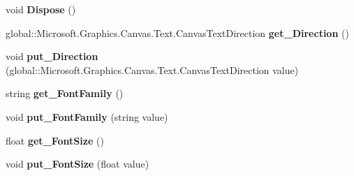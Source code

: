 \begin{DoxyCompactItemize}
\mbox{\label{class_microsoft_1_1_graphics_1_1_canvas_1_1_text_1_1_canvas_text_format_a174c6d766e1732425a63a7ee7ca6a9bb}} 
void {\bfseries Dispose} ()
\item 
\mbox{\label{class_microsoft_1_1_graphics_1_1_canvas_1_1_text_1_1_canvas_text_format_a47023dedd64cd980189d5fc8fe614629}} 
global\+::\+Microsoft.\+Graphics.\+Canvas.\+Text.\+Canvas\+Text\+Direction {\bfseries get\+\_\+\+Direction} ()
\item 
\mbox{\label{class_microsoft_1_1_graphics_1_1_canvas_1_1_text_1_1_canvas_text_format_a345d3dff62bda0ba2440e40e7a5abbc6}} 
void {\bfseries put\+\_\+\+Direction} (global\+::\+Microsoft.\+Graphics.\+Canvas.\+Text.\+Canvas\+Text\+Direction value)
\item 
\mbox{\label{class_microsoft_1_1_graphics_1_1_canvas_1_1_text_1_1_canvas_text_format_a49be7f6687260bafd4e46d160d645c7c}} 
string {\bfseries get\+\_\+\+Font\+Family} ()
\item 
\mbox{\label{class_microsoft_1_1_graphics_1_1_canvas_1_1_text_1_1_canvas_text_format_a7b755c0c506c4ca08e5019ddb932ce37}} 
void {\bfseries put\+\_\+\+Font\+Family} (string value)
\item 
\mbox{\label{class_microsoft_1_1_graphics_1_1_canvas_1_1_text_1_1_canvas_text_format_a373a244b91f0a4a9b07a9757f2abd097}} 
float {\bfseries get\+\_\+\+Font\+Size} ()
\item 
\mbox{\label{class_microsoft_1_1_graphics_1_1_canvas_1_1_text_1_1_canvas_text_format_a218056f08c9d5a288afaaa910a6dcf20}} 
void {\bfseries put\+\_\+\+Font\+Size} (float value)
\item 
\mbox{\label{class_microsoft_1_1_graphics_1_1_canvas_1_1_text_1_1_canvas_text_format_a8fa0c462a565f04478992f537b8bbeef}} 

\end{DoxyCompactItemize}
